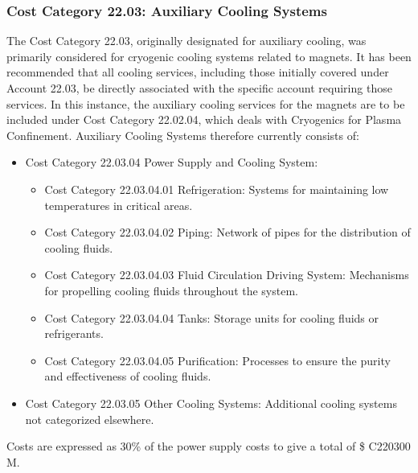 \subsubsection{Cost Category 22.03: Auxiliary Cooling Systems}

The Cost Category 22.03, originally designated for auxiliary cooling, was primarily considered for cryogenic cooling systems related to magnets. It has been recommended that all cooling services, including those initially covered under Account 22.03, be directly associated with the specific account requiring those services. In this instance, the auxiliary cooling services for the magnets are to be included under Cost Category 22.02.04, which deals with Cryogenics for Plasma Confinement. Auxiliary Cooling Systems therefore currently consists of:

\begin{itemize}
    \item Cost Category 22.03.04 Power Supply and Cooling System: 
    \begin{itemize}
        \item Cost Category 22.03.04.01 Refrigeration: Systems for maintaining low temperatures in critical areas.
        \item Cost Category 22.03.04.02 Piping: Network of pipes for the distribution of cooling fluids.
        \item Cost Category 22.03.04.03 Fluid Circulation Driving System: Mechanisms for propelling cooling fluids throughout the system.
        \item Cost Category 22.03.04.04 Tanks: Storage units for cooling fluids or refrigerants.
        \item Cost Category 22.03.04.05 Purification: Processes to ensure the purity and effectiveness of cooling fluids.
    \end{itemize}
    \item Cost Category 22.03.05 Other Cooling Systems: Additional cooling systems not categorized elsewhere.
\end{itemize}

Costs are expressed as 30\% of the power supply costs to give a total of \$ C220300 M.